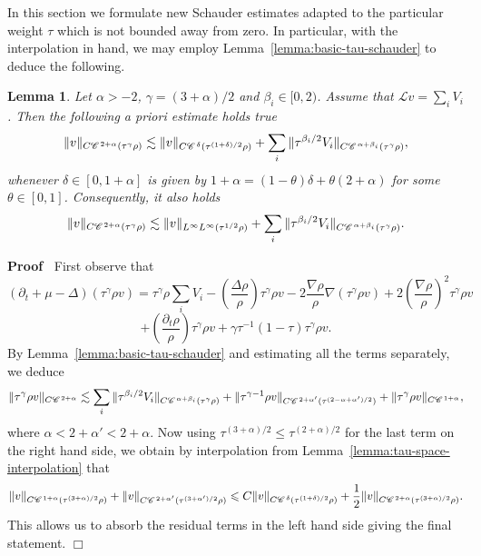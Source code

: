 \documentclass[a4paper,11pt]{article}
\renewcommand{\leq}{\leqslant}
\newenvironment{proof}{\noindent\textbf{Proof\ }}{\hspace*{\fill}$\Box$\medskip}
\newtheorem{lemma}[theorem]{Lemma}
\numberwithin{equation}{section}
\newcommand{\CC}{\mathscr{C} \hspace{.1em}}
\newcommand{\LL}{\mathscr{L}}
\newcommand{\8}{\infty}
\begin{document}
In this section we formulate new Schauder estimates  adapted to the particular weight $\tau$ which is not bounded away from zero. 
In particular, with the interpolation in hand, we may  employ Lemma~\ref{lemma:basic-tau-schauder} to deduce the following.


\begin{lemma}
  \label{lemma:tau-weighted-schauder}
   Let $\alpha
  > - 2$, $\gamma = (3 + \alpha) / 2$ and $\beta_i \in [0, 2)$. Assume that
  $\LL v = \sum_i V_i$. Then the following a priori estimate holds true
  \[ \| v \|_{C \CC^{2 + \alpha} (\tau^{\gamma} \rho)} \lesssim \| v \|_{C
     \CC^{\delta} (\tau^{(1 + \delta) / 2} \rho)} + \sum_i \| \tau^{\beta_i /
     2} V_i \|_{C \CC^{\alpha + \beta_i} (\tau^{\gamma} \rho)}, \]
  whenever $\delta \in [0, 1 + \alpha]$ is given by $1 + \alpha = (1 - \theta)
  \delta + \theta (2 + \alpha)$ for some $\theta \in [0, 1]$. Consequently, it
  also holds
  \[ \| v \|_{C \CC^{2 + \alpha} (\tau^{\gamma} \rho)} \lesssim \| v
     \|_{L^{\infty} L^{\infty} (\tau^{1 / 2} \rho)} + \sum_i \| \tau^{\beta_i
     / 2} V_i \|_{C \CC^{\alpha + \beta_i} (\tau^{\gamma} \rho)} . \]
\end{lemma}

\begin{proof}
First observe that
  \[ (\partial_t + \mu - \Delta) (\tau^{\gamma} \rho v) = \tau^{\gamma} \rho \sum_i V_i
     - \left( \frac{\Delta \rho}{\rho} \right) \tau^{\gamma} \rho v - 2
     \frac{\nabla \rho}{\rho} \nabla (\tau^{\gamma} \rho v) + 2 \left(
     \frac{\nabla \rho}{\rho} \right)^2 \tau^{\gamma} \rho v  \]
  \[ + \left(
     \frac{\partial_t \rho}{\rho} \right) \tau^{\gamma} \rho v+ \gamma \tau^{- 1} (1 - \tau) \tau^{\gamma} \rho v. \]
  By Lemma~\ref{lemma:basic-tau-schauder} and estimating all the terms
  separately, we deduce
  \[ \| \tau^{\gamma} \rho v \|_{C \CC^{2 + \alpha}} \lesssim  \sum_i \| \tau^{\beta_i /
     2} V_i \|_{C \CC^{\alpha + \beta_i} (\tau^{\gamma} \rho)} + \| \tau^{\gamma - 1} \rho v \|_{C \CC^{2 +
     \alpha'} (\tau^{(2 - \alpha + \alpha') / 2})} + \| \tau^{\gamma} \rho v
     \|_{C \CC^{1 + \alpha}}, \]
  where $\alpha < 2 + \alpha' < 2 + \alpha$. Now using  $\tau^{(3+\alpha)/2}\leq \tau^{(2+\alpha)/2}$ for the last term on the right hand side, we obtain by interpolation from
  Lemma~\ref{lemma:tau-space-interpolation} that 
  \[ \| v \|_{C \CC^{1 + \alpha} (\tau^{(3 + \alpha) / 2} \rho)} + \| v \|_{C
     \CC^{2 + \alpha'} (\tau^{(3 + \alpha') / 2} \rho)} \leqslant C \| v \|_{C
     \CC^{\delta} (\tau^{(1 + \delta) / 2} \rho)} + \frac{1}{2} \| v \|_{C
     \CC^{2 + \alpha} (\tau^{(3 + \alpha) / 2} \rho)} . \]
  This allows us to absorb the residual terms in the left hand side giving the
  final statement.
\end{proof}
\end{document}
